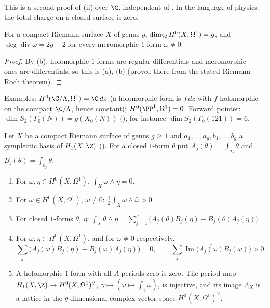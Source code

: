This is a second proof of (ii) over $\C$, independent of . In the language of physics: the total charge on a
closed surface is zero.

\begin{theorem}\label{thm:curves:genus-dimension}
For a compact Riemann surface $X$ of genus $g$, $\dim_\C H^0(X,\Omega^1)=g$, and $\deg\operatorname{div}\omega=2g-2$ for every meromorphic $1$-form $\omega\ne0$.
\end{theorem}

\begin{proof}
By (b), holomorphic $1$-forms are regular differentials and meromorphic ones are differentials, so this is
(a), (b) (proved there from the stated Riemann-Roch theorem).
\end{proof}

Examples: $H^0(\C/\Lambda,\Omega^1)=\C\,dz$ (a holomorphic form is $f\,dz$ with $f$ holomorphic on the compact $\C/\Lambda$, hence constant); $H^0(\PP^1,\Omega^1)=0$.
Forward pointer: $\dim S_2(\Gamma_0(N))=g(X_0(N))$ (), for instance $\dim S_2(\Gamma_0(121))=6$.

\begin{theorem}\label{thm:curves:bilinear-relations}
Let $X$ be a compact Riemann surface of genus $g\ge1$ and $a_1,\dots,a_g,b_1,\dots,b_g$ a symplectic basis of $H_1(X,\Z)$ (). For a closed
$1$-form $\theta$ put $A_j(\theta)=\int_{a_j}\theta$ and $B_j(\theta)=\int_{b_j}\theta$.
\begin{enumerate}[label=(\alph*)]
\item For $\omega,\eta\in H^0(X,\Omega^1)$, $\int_X\omega\wedge\eta=0$.
\item For $\omega\in H^0(X,\Omega^1)$, $\omega\ne0$: $\frac i2\int_X\omega\wedge\bar\omega>0$.
\item For closed $1$-forms $\theta$, $\eta$: $\displaystyle\int_X\theta\wedge\eta=\sum_{j=1}^g\bigl(A_j(\theta)B_j(\eta)-B_j(\theta)A_j(\eta)\bigr)$.
\item For $\omega,\eta\in H^0(X,\Omega^1)$, and for $\omega\ne0$ respectively,
\[
\sum_j\bigl(A_j(\omega)B_j(\eta)-B_j(\omega)A_j(\eta)\bigr)=0,\qquad\sum_j\operatorname{Im}\bigl(\overline{A_j(\omega)}B_j(\omega)\bigr)>0.
\]
\item A holomorphic $1$-form with all $A$-periods zero is zero. The period map $H_1(X,\Z)\to H^0(X,\Omega^1)^\vee$, $\gamma\mapsto(\omega\mapsto\int_\gamma\omega)$, is injective, and its image
$\Lambda_X$ is a lattice in the $g$-dimensional complex vector space $H^0(X,\Omega^1)^\vee$.
\end{enumerate}
\end{theorem}

